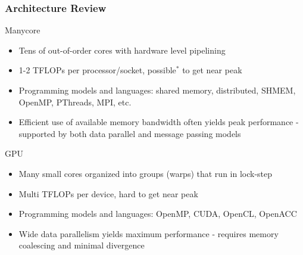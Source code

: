 \documentclass{beamer}
\begin{document}
\begin{frame}
  \frametitle{Architecture Review}
  Manycore
  \begin{itemize}
    \item Tens of out-of-order cores with hardware level pipelining
    \item 1-2 TFLOPs per processor/socket, possible$^{*}$ to get near
      peak
    \item Programming models and languages: shared memory,
      distributed, SHMEM, OpenMP, PThreads, MPI, etc.
    \item Efficient use of available memory bandwidth often yields peak performance - 
      supported by both data parallel and message passing models
  \end{itemize}
  GPU
  \begin{itemize}
    \item Many small cores organized into groups (warps) that run in lock-step
    \item Multi TFLOPs per device, hard to get near peak
    \item Programming models and languages: OpenMP, CUDA, OpenCL,
      OpenACC
    \item Wide data parallelism yields maximum performance - requires memory
      coalescing and minimal divergence
  \end{itemize}
\end{frame}
\end{document}
